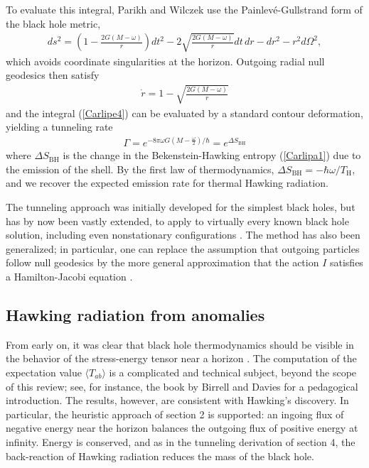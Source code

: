 \documentclass[11pt]{article}
\begin{document}
To evaluate this integral, Parikh and Wilczek use the Painlev{\'e}-Gullstrand
form of the black hole metric,
\begin{align}
ds^2 = \left(1-\frac{2G(M-\omega)}{r}\right)dt^2 
  - 2\sqrt{\frac{2G(M-\omega)}{r}}dt\,dr - dr^2 - r^2d\Omega^2  ,
\label{Carlipe2}
\end{align}
which avoids coordinate singularities at the horizon.  Outgoing radial 
null geodesics then satisfy
\begin{align*}
{\dot r} = 1 - \sqrt{\frac{2G(M-\omega)}{r}} 
\end{align*}
and the integral  (\ref{Carlipe4}) can be evaluated by a standard contour
deformation, yielding a tunneling rate
\begin{align}
\Gamma = e^{-8\pi\omega G\left(M - \frac{\omega}{2}\right)/\hbar} 
 = e^{\Delta S_{\scriptscriptstyle\mathrm{BH}}}
\label{Carlipe5}
\end{align}
where $\Delta S_{\scriptscriptstyle\mathrm{BH}}$ is the change in the 
Bekenstein-Hawking entropy (\ref{Carlipa1}) due to the emission of the shell.  
By the first law of thermodynamics, $\Delta S_{\scriptscriptstyle\mathrm{BH}} 
= -\hbar\omega/T_{\scriptscriptstyle\mathrm{H}}$, and we recover the 
expected emission rate for thermal Hawking radiation.  

The tunneling approach was initially developed for the simplest black holes,  
but has by now been vastly extended, to apply to virtually every known
black hole solution, including even nonstationary configurations 
\cite{Vanzoreview}.  The method has also been generalized; in particular,
one can replace the assumption that outgoing particles follow null 
geodesics by the more general approximation that the action $I$ satisfies 
a Hamilton-Jacobi equation \cite{HJ}.   

\subsection{Hawking radiation from anomalies \label{anoma}}

From early on, it was clear that black hole thermodynamics should be
visible in the behavior of the stress-energy tensor near a   
horizon \cite{DeWitt,Daviesx}.  The computation of the expectation
value $\langle T_{ab}\rangle$ is a complicated and technical subject, 
beyond the scope of this review; see, for instance, the book by Birrell and 
Davies \cite{BirrellDavies} for a pedagogical introduction.  The results, however, 
are consistent with Hawking's discovery.  In particular, the heuristic approach
of section 2 is supported:  an ingoing flux of negative energy 
near the horizon balances the outgoing flux of positive energy at infinity.  
Energy is conserved, and as in the tunneling derivation of section 4, 
the back-reaction of Hawking radiation reduces the mass of the black hole.
\end{document}
